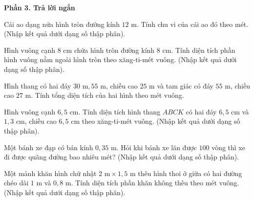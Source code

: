 \textbf{Phần 3. Trả lời ngắn}

\begin{ex} %
Cái ao dạng nửa hình tròn đường kính $12\text{ m}$. Tính chu vi của cái ao đó theo mét. (Nhập kết quả dưới dạng số thập phân).
\end{ex}

\begin{ex} %
Hình vuông cạnh $8\text{ cm}$ chứa hình tròn đường kính $8\text{ cm}$. Tính diện tích phần hình vuông nằm ngoài hình tròn theo xăng-ti-mét vuông. (Nhập kết quả dưới dạng số thập phân).
\end{ex}

\begin{ex} %
Hình thang có hai đáy $30\text{ m}, 55\text{ m}$, chiều cao $25\text{ m}$ và tam giác có đáy $55\text{ m}$, chiều cao $27\text{ m}$. Tính tổng diện tích của hai hình theo mét vuông.
\end{ex}

\begin{ex} %
Hình vuông cạnh $6{,}5\text{ cm}$. Tính diện tích hình thang $ABCK$ có hai đáy $6{,}5\text{ cm}$ và $1{,}3\text{ cm}$, chiều cao $6{,}5\text{ cm}$ theo xăng-ti-mét vuông. (Nhập kết quả dưới dạng số thập phân).
\end{ex}

\begin{ex} %
Một bánh xe đạp có bán kính $0{,}35\text{ m}$. Hỏi khi bánh xe lăn được $100$ vòng thì xe đi được quãng đường bao nhiêu mét? (Nhập kết quả dưới dạng số thập phân).
\end{ex}

\begin{ex} %
Một mảnh khăn hình chữ nhật $2\text{ m} \times 1{,}5\text{ m}$ thêu hình thoi ở giữa có hai đường chéo dài $1\text{ m}$ và $0{,}8\text{ m}$. Tính diện tích phần khăn không thêu theo mét vuông. (Nhập kết quả dưới dạng số thập phân).
\end{ex}
